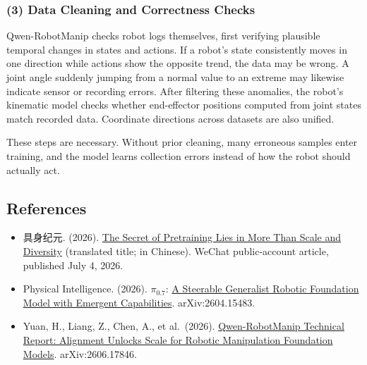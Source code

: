 \hypertarget{data-cleaning-and-correctness-checks}{%
\subsubsection{(3) Data Cleaning and Correctness Checks}\label{data-cleaning-and-correctness-checks}}

Qwen-RobotManip checks robot logs themselves, first verifying plausible temporal changes in states and actions. If a robot's state consistently moves in one direction while actions show the opposite trend, the data may be wrong. A joint angle suddenly jumping from a normal value to an extreme may likewise indicate sensor or recording errors. After filtering these anomalies, the robot's kinematic model checks whether end-effector positions computed from joint states match recorded data. Coordinate directions across datasets are also unified.

These steps are necessary. Without prior cleaning, many erroneous samples enter training, and the model learns collection errors instead of how the robot should actually act.

\FloatBarrier
{}
\hypertarget{references-165}{%
\subsection{References}\label{references-165}}

\vspace{0.25em}
\begin{itemize}
\tightlist
\item
  具身纪元. (2026). \href{https://www.jintiankansha.com/t/8QXVctCOWG}{The Secret of Pretraining Lies in More Than Scale and Diversity} (translated title; in Chinese). WeChat public-account article, published July 4, 2026.
\item
  Physical Intelligence. (2026). \(\pi_{0.7}\): \href{https://arxiv.org/abs/2604.15483}{A Steerable Generalist Robotic Foundation Model with Emergent Capabilities}. arXiv:2604.15483.
\item
  Yuan, H., Liang, Z., Chen, A., et al.~(2026). \href{https://arxiv.org/abs/2606.17846}{Qwen-RobotManip Technical Report: Alignment Unlocks Scale for Robotic Manipulation Foundation Models}. arXiv:2606.17846.
\end{itemize}

\clearpage
